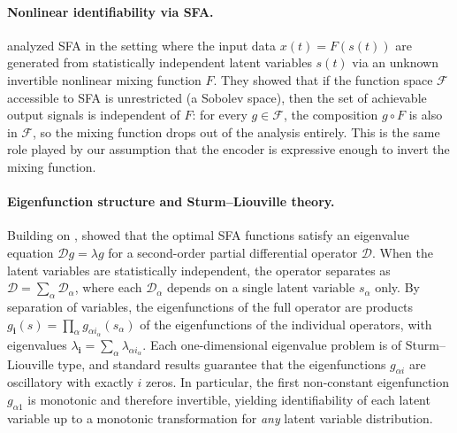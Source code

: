 \paragraph{Nonlinear identifiability via SFA.}
\citet{sprekeler2014} analyzed SFA in the setting where the input data $x(t) = F(s(t))$ are generated from statistically independent latent variables $s(t)$ via an unknown invertible nonlinear mixing function $F$.
They showed that if the function space $\mathcal{F}$ accessible to SFA is unrestricted (a Sobolev space), then the set of achievable output signals is independent of $F$: for every $g \in \mathcal{F}$, the composition $g \circ F$ is also in $\mathcal{F}$, so the mixing function drops out of the analysis entirely.
This is the same role played by our assumption that the encoder is expressive enough to invert the mixing function.

\paragraph{Eigenfunction structure and Sturm--Liouville theory.}
Building on \citet{franzius2007}, \citet{sprekeler2014} showed that the optimal SFA functions satisfy an eigenvalue equation $\mathcal{D} g = \lambda g$ for a second-order partial differential operator $\mathcal{D}$.
When the latent variables are statistically independent, the operator separates as $\mathcal{D} = \sum_\alpha \mathcal{D}_\alpha$, where each $\mathcal{D}_\alpha$ depends on a single latent variable $s_\alpha$ only.
By separation of variables, the eigenfunctions of the full operator are products $g_{\mathbf{i}}(s) = \prod_\alpha g_{\alpha i_\alpha}(s_\alpha)$ of the eigenfunctions of the individual operators, with eigenvalues $\lambda_{\mathbf{i}} = \sum_\alpha \lambda_{\alpha i_\alpha}$.
Each one-dimensional eigenvalue problem is of Sturm--Liouville type, and standard results guarantee that the eigenfunctions $g_{\alpha i}$ are oscillatory with exactly $i$ zeros.
In particular, the first non-constant eigenfunction $g_{\alpha 1}$ is monotonic and therefore invertible, yielding identifiability of each latent variable up to a monotonic transformation for \emph{any} latent variable distribution.

